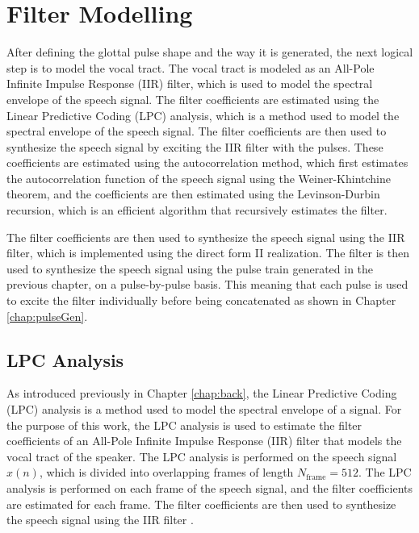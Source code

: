 \chapter{Filter Modelling} \label{chap:filt}

After defining the glottal pulse shape and the way it is generated, the next logical step is to model the vocal tract. The vocal tract is modeled as an All-Pole Infinite Impulse Response (IIR) filter, which is used to model the spectral envelope of the speech signal. The filter coefficients are estimated using the Linear Predictive Coding (LPC) analysis, which is a method used to model the spectral envelope of the speech signal. The filter coefficients are then used to synthesize the speech signal by exciting the IIR filter with the pulses. These coefficients are estimated using the autocorrelation method, which first estimates the autocorrelation function of the speech signal using the Weiner-Khintchine theorem, and the coefficients are then estimated using the Levinson-Durbin recursion, which is an efficient algorithm that recursively estimates the filter. 

The filter coefficients are then used to synthesize the speech signal using the IIR filter, which is implemented using the direct form II realization. The filter is then used to synthesize the speech signal using the pulse train generated in the previous chapter, on a pulse-by-pulse basis. This meaning that each pulse is used to excite the filter individually before being concatenated as shown in Chapter \ref{chap:pulseGen}.


\section{LPC Analysis}

As introduced previously in Chapter \ref{chap:back}, the Linear Predictive Coding (LPC) analysis is a method used to model the spectral envelope of a signal. For the purpose of this work, the LPC analysis is used to estimate the filter coefficients of an All-Pole Infinite Impulse Response (IIR) filter that models the vocal tract of the speaker. The LPC analysis is performed on the speech signal $x(n)$, which is divided into overlapping frames of length $N_{\text{frame}} = 512$. The LPC analysis is performed on each frame of the speech signal, and the filter coefficients are estimated for each frame. The filter coefficients are then used to synthesize the speech signal using the IIR filter \cite{hayes1996statistical}.


